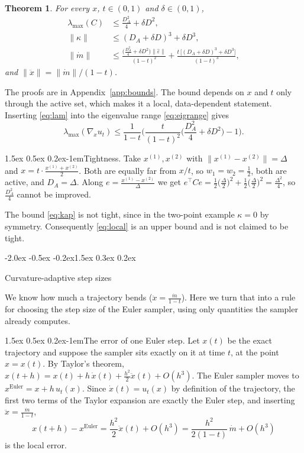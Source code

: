\documentclass{article}
\makeatletter
\renewcommand{\normalsize}{\fontsize{10pt}{11pt}\selectfont}
\renewcommand{\section}{\@startsection{section}{1}{\z@}%
  {-2.0ex \@plus -0.5ex \@minus -0.2ex}{1.5ex \@plus 0.3ex \@minus 0.2ex}{\large\bfseries\raggedright}}
\renewcommand{\paragraph}{\@startsection{paragraph}{4}{\z@}%
  {1.5ex \@plus 0.5ex \@minus 0.2ex}{-1em}{\normalsize\bfseries}}
\newtheorem{theorem}{Theorem}
\theoremstyle{remark}
\newcommand{\xn}[1]{x^{(#1)}}
\newcommand{\eps}{\hat\varepsilon}
\newcommand{\lmax}{\lambda_{\max}}
\makeatother
\begin{document}
\begin{theorem}\label{thm:local}
For every $x$, $t \in (0,1)$ and $\delta \in (0,1)$,
\begin{align}
  \lmax(C)&\le \frac{D_A^2}{4} + \delta D^2, \label{eq:lam}\\
  \|\kappa\|&\le (D_A + \delta D)^3 + \delta D^3, \label{eq:kap}\\
  \|\dot m\|&\le \frac{\big(\frac{D_A^2}{4} + \delta D^2\big)\|\eps\|}{(1 - t)^2} + \frac{t\,\big[(D_A + \delta D)^3 + \delta D^3\big]}{(1 - t)^3}, \label{eq:local}
\end{align}
and $\|\ddot x\| = \|\dot m\|/(1 - t)$.
\end{theorem}
The proofs are in Appendix~\ref{app:bounds}. The bound depends on $x$ and $t$ only through the active set, which makes it a local, data-dependent statement. Inserting \eqref{eq:lam} into the eigenvalue range \eqref{eq:eigrange} gives
\begin{equation}\label{eq:lamjac}
  \lmax(\nabla_xu_t) \le \frac{1}{1 - t}\Big(\frac{t}{(1 - t)^2}\Big(\frac{D_A^2}{4} + \delta D^2\Big) - 1\Big).
\end{equation}

\paragraph{Tightness.} Take $\xn{1},\xn{2}$ with $\|\xn{1} - \xn{2}\| = \Delta$ and $x = t \cdot \frac{\xn{1} + \xn{2}}{2}$. Both are equally far from $x/t$, so $w_1 = w_2 = \frac12$, both are active, and $D_A = \Delta$. Along $e = \frac{\xn{1} - \xn{2}}{\Delta}$ we get $e^\top Ce = \frac12\big(\frac\Delta2\big)^2 + \frac12\big(\frac\Delta2\big)^2 = \frac{\Delta^2}{4}$, so $\frac{D_A^2}{4}$ cannot be improved.

The bound \eqref{eq:kap} is not tight, since in the two-point example $\kappa = 0$ by symmetry. Consequently \eqref{eq:local} is an upper bound and is not claimed to be tight.

\section{Curvature-adaptive step sizes}\label{sec:sampler}

We know how much a trajectory bends ($\ddot x = \frac{\dot m}{1 - t}$). Here we turn that into a rule for choosing the step size of the Euler sampler, using only quantities the sampler already computes.

\paragraph{The error of one Euler step.} Let $x(t)$ be the exact trajectory and suppose the sampler sits exactly on it at time $t$, at the point $x = x(t)$. By Taylor's theorem, $x(t + h) = x(t) + h\,\dot x(t) + \frac{h^2}{2}\ddot x(t) + O(h^3)$. The Euler sampler moves to $x^{\mathrm{Euler}} = x + h\,u_t(x)$. Since $\dot x(t) = u_t(x)$ by definition of the trajectory, the first two terms of the Taylor expansion are exactly the Euler step, and inserting $\ddot x = \frac{\dot m}{1 - t}$,
\[
  x(t + h) - x^{\mathrm{Euler}} = \frac{h^2}{2}\ddot x(t) + O(h^3) = \frac{h^2}{2(1 - t)}\,\dot m + O(h^3)
\]
is the local error.
\end{document}
